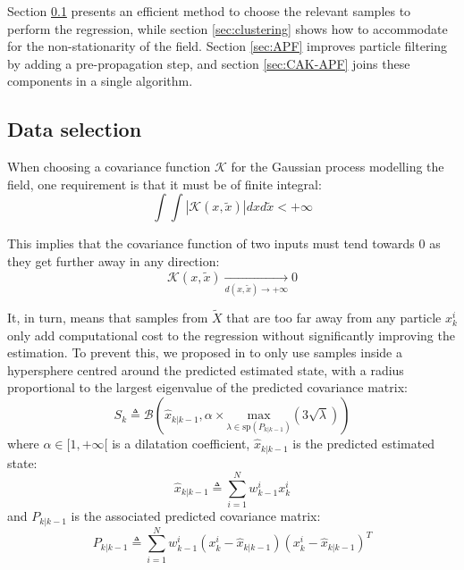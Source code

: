 \documentclass[conference]{IEEEtran}
\begin{document}
Section \ref{sec:data selection} presents an efficient method to choose the relevant samples to perform the regression, while section \ref{sec:clustering} shows how to accommodate for the non-stationarity of the field. Section \ref{sec:APF} improves particle filtering by adding a pre-propagation step, and section \ref{sec:CAK-APF} joins these components in a single algorithm.

\subsection{Data selection}\label{sec:data selection}

When choosing a covariance function $\mathcal{K}$ for the Gaussian process modelling the field, one requirement is that it must be of finite integral:
\begin{equation}
\textstyle\int\int\left|\mathcal{K}(x,\tilde{x})\right|dxd\tilde{x}<+\infty
\end{equation}

This implies that the covariance function of two inputs must tend towards $0$ as they get further away in any direction:
\begin{equation}
\mathcal{K}(x,\tilde{x})\underset{d(x,\tilde{x})\rightarrow+\infty}{\longrightarrow}0
\end{equation}

It, in turn, means that samples from $\tilde{X}$ that are too far away from any particle $x_k^i$ only add computational cost to the regression without significantly improving the estimation. To prevent this, we proposed in \cite{bib:AK-RPF} to only use samples inside a hypersphere centred around the predicted estimated state, with a radius proportional to the largest eigenvalue of the predicted covariance matrix:
\begin{equation}
S_k\triangleq\mathcal{B}\left(\hat{x}_{k|k-1},\alpha\times\underset{\lambda\in\text{sp}(P_{k|k-1})}{\text{max}}\left(3\sqrt{\lambda}\right)\right)\label{eq:data selection}
\end{equation}
where $\alpha\in[1,+\infty[$ is a dilatation coefficient, $\hat{x}_{k|k-1}$ is the predicted estimated state:
\begin{equation}
\textstyle \hat{x}_{k|k-1}\triangleq\sum_{i=1}^Nw_{k-1}^ix_k^i
\end{equation}
and $P_{k|k-1}$ is the associated predicted covariance matrix:
\begin{equation}
\textstyle P_{k|k-1}\triangleq\sum_{i=1}^Nw_{k-1}^i(x_k^i-\hat{x}_{k|k-1})(x_k^i-\hat{x}_{k|k-1})^T
\end{equation}
\end{document}
